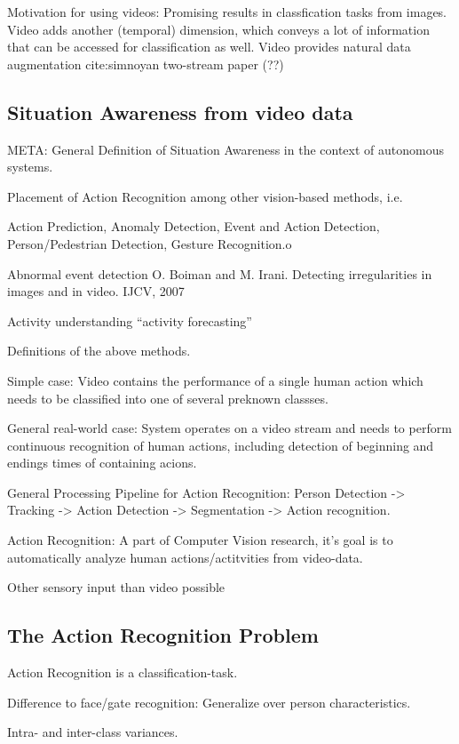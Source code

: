Motivation for using videos: Promising results in classfication tasks from images.
Video adds another (temporal) dimension, which conveys a lot of information that can be accessed for classification as well.
Video provides natural data augmentation cite:simnoyan two-stream paper (??)

\subsection{Situation Awareness from video data}

META: General Definition of Situation Awareness in the context of autonomous systems.

Placement of Action Recognition among other vision-based methods, i.e.

Action Prediction, Anomaly Detection, Event and Action Detection, Person/Pedestrian Detection, Gesture Recognition.o

Abnormal event detection O. Boiman and M. Irani. Detecting irregularities in images and in video. IJCV, 2007

Activity understanding ``activity forecasting''

Definitions of the above methods.

Simple case: Video contains the performance of a single human action which needs to be classified into one of several preknown classses.

General real-world case: System operates on a video stream and needs to perform continuous recognition of human actions, including detection of beginning and endings times of containing acions.

General Processing Pipeline for Action Recognition: Person Detection -> Tracking -> Action Detection -> Segmentation -> Action recognition.

Action Recognition: A part of Computer Vision research, it's goal is to automatically analyze human actions/actitvities from video-data.

Other sensory input than video possible 

\subsection{The Action Recognition Problem}
Action Recognition is a classification-task.

Difference to face/gate recognition: Generalize over person characteristics.

Intra- and inter-class variances.

